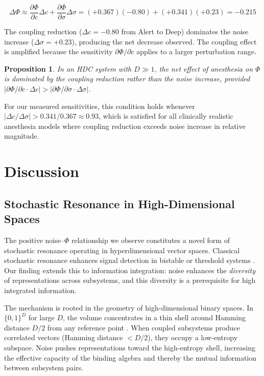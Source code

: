 \documentclass[12pt,a4paper]{article}
\newtheorem{proposition}{Proposition}
\begin{document}
\begin{equation}
\Delta\Phi \approx \frac{\partial\Phi}{\partial c} \Delta c + \frac{\partial\Phi}{\partial \sigma} \Delta\sigma = (+0.367)(-0.80) + (+0.341)(+0.23) = -0.215
\end{equation}

The coupling reduction ($\Delta c = -0.80$ from Alert to Deep) dominates the noise increase ($\Delta\sigma = +0.23$), producing the net decrease observed. The coupling effect is amplified because the sensitivity $\partial\Phi/\partial c$ applies to a larger perturbation range.

\begin{proposition}
In an HDC system with $D \gg 1$, the net effect of anesthesia on $\Phi$ is dominated by the coupling reduction rather than the noise increase, provided $|\partial\Phi/\partial c \cdot \Delta c| > |\partial\Phi/\partial\sigma \cdot \Delta\sigma|$.
\end{proposition}

For our measured sensitivities, this condition holds whenever $|\Delta c / \Delta\sigma| > 0.341/0.367 \approx 0.93$, which is satisfied for all clinically realistic anesthesia models where coupling reduction exceeds noise increase in relative magnitude.

\section{Discussion}

\subsection{Stochastic Resonance in High-Dimensional Spaces}

The positive noise--$\Phi$ relationship we observe constitutes a novel form of stochastic resonance operating in hyperdimensional vector spaces. Classical stochastic resonance enhances signal detection in bistable or threshold systems \citep{gammaitoni1998stochastic}. Our finding extends this to information integration: noise enhances the \emph{diversity} of representations across subsystems, and this diversity is a prerequisite for high integrated information.

The mechanism is rooted in the geometry of high-dimensional binary spaces. In $\{0,1\}^D$ for large $D$, the volume concentrates in a thin shell around Hamming distance $D/2$ from any reference point \citep{kanerva2009hyperdimensional}. When coupled subsystems produce correlated vectors (Hamming distance $< D/2$), they occupy a low-entropy subspace. Noise pushes representations toward the high-entropy shell, increasing the effective capacity of the binding algebra and thereby the mutual information between subsystem pairs.
\end{document}
